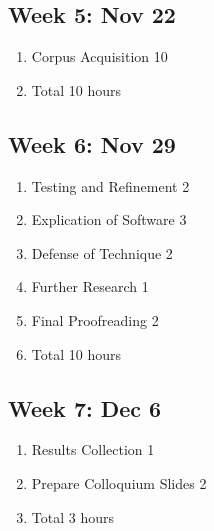 \documentclass[10pt]{article}
\begin{document}
\subsection{Week 5: Nov 22}
\begin{enumerate}
\item Corpus Acquisition 10
\item Total 10 hours
\end{enumerate}

\subsection{Week 6: Nov 29}
\begin{enumerate}
\item Testing and Refinement 2
\item Explication of Software 3
\item Defense of Technique 2
\item Further Research 1
\item Final Proofreading 2
\item Total 10 hours
\end{enumerate}

\subsection{Week 7: Dec 6}
\begin{enumerate}
\item Results Collection 1
\item Prepare Colloquium Slides 2
\item Total 3 hours
\end{enumerate}



\end{document}
